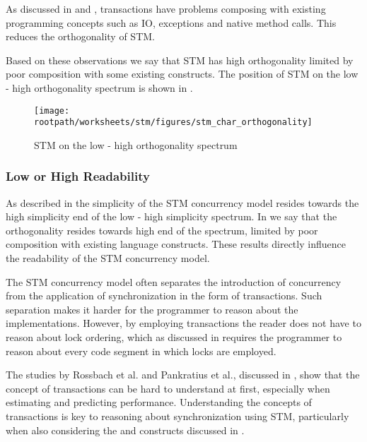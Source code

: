 As discussed in  and , transactions have problems composing with existing programming concepts such as \ac{IO}, exceptions and native method calls. This reduces the orthogonality of \ac{STM}.


Based on these observations we say that \ac{STM} has high orthogonality limited by poor composition with some existing constructs. The position of \ac{STM} on the low - high orthogonality spectrum is shown in .

\begin{figure}[htbp]
\centering
 \texttt{[image: \\rootpath/worksheets/stm/figures/stm\_char\_orthogonality]} 
 \caption{\ac{STM} on the low - high orthogonality spectrum}
\label{fig:char_stm_orthogonality}
\end{figure}

\subsubsection{Low or High Readability}
As described in  the simplicity of the \ac{STM} concurrency model resides towards the high simplicity end of the low - high simplicity spectrum. In  we say that the orthogonality resides towards high end of the spectrum, limited by poor composition with existing language constructs. These results directly influence the readability of the \ac{STM} concurrency model.

The \ac{STM} concurrency model often separates the introduction of concurrency from the application of synchronization in the form of transactions. Such separation makes it harder for the programmer to reason about the implementations. However, by employing transactions the reader does not have to reason about lock ordering, which as discussed in  requires the programmer to reason about every code segment in which locks are employed.

The studies by Rossbach et al. and Pankratius et al., discussed in , show that the concept of transactions can be hard to understand at first, especially when estimating and predicting performance. Understanding the concepts of transactions is key to reasoning about synchronization using \ac{STM}, particularly when also considering the  and  constructs discussed in .

